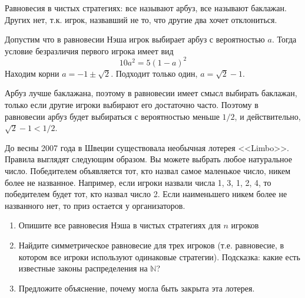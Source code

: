 \begin{solution}
Равновесия в чистых стратегиях: все называют арбуз, все называют баклажан. Других нет, т.к. игрок, назвавший не то, что другие два хочет отклониться.

Допустим что в равновесии Нэша игрок выбирает арбуз с вероятностью $a$. Тогда условие безразличия первого игрока имеет вид
\[
10 a^2 = 5(1-a)^2 
\]
Находим корни $a=-1\pm \sqrt{2}$. Подходит только один, $a=\sqrt{2}-1$.  

Арбуз лучше баклажана, поэтому в равновесии имеет смысл выбирать баклажан, только если другие игроки выбирают его достаточно часто. Поэтому в равновесии арбуз будет выбираться  с вероятностью меньше $1/2$, и действительно, $\sqrt{2}-1<1/2$.
\end{solution}



\begin{problem}
До весны 2007 года в Швеции существовала необычная лотерея <<Limbo>>. Правила выглядят следующим образом. Вы можете выбрать любое натуральное число. Победителем объявляется тот, кто назвал самое маленькое число, никем более не названное. Например, если игроки назвали числа 1, 3, 1, 2, 4, то победителем будет тот, кто назвал число 2. Если наименьшего никем более не названного нет, то приз остается у организаторов. 
\begin{enumerate}
\item  Опишите все равновесия Нэша в чистых стратегиях для $n$ игроков 
\item  Найдите симметрическое равновесие для трех игроков (т.е. равновесие, в котором все игроки используют одинаковые стратегии). Подсказка: какие есть известные законы распределения на $\mathbb{N}$? 
\item Предложите объяснение, почему могла быть закрыта эта лотерея.

\end{enumerate}
\end{problem}

